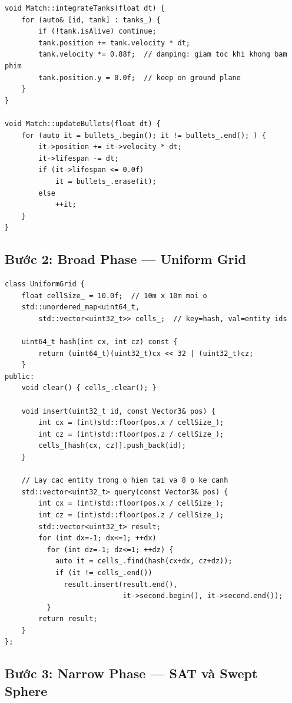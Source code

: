 \documentclass[12pt,a4paper]{report}
\begin{document}
\begin{lstlisting}[style=cppStyle, caption={Tích phân vị trí mỗi tick}, label={lst:integration}]
void Match::integrateTanks(float dt) {
    for (auto& [id, tank] : tanks_) {
        if (!tank.isAlive) continue;
        tank.position += tank.velocity * dt;
        tank.velocity *= 0.88f;  // damping: giam toc khi khong bam phim
        tank.position.y = 0.0f;  // keep on ground plane
    }
}

void Match::updateBullets(float dt) {
    for (auto it = bullets_.begin(); it != bullets_.end(); ) {
        it->position += it->velocity * dt;
        it->lifespan -= dt;
        if (it->lifespan <= 0.0f)
            it = bullets_.erase(it);
        else
            ++it;
    }
}
\end{lstlisting}

\subsection{Bước 2: Broad Phase --- Uniform Grid}

\begin{lstlisting}[style=cppStyle, caption={Uniform Grid Spatial Hash cho broad phase}, label={lst:broadphase}]
class UniformGrid {
    float cellSize_ = 10.0f;  // 10m x 10m moi o
    std::unordered_map<uint64_t,
        std::vector<uint32_t>> cells_;  // key=hash, val=entity ids

    uint64_t hash(int cx, int cz) const {
        return (uint64_t)(uint32_t)cx << 32 | (uint32_t)cz;
    }
public:
    void clear() { cells_.clear(); }

    void insert(uint32_t id, const Vector3& pos) {
        int cx = (int)std::floor(pos.x / cellSize_);
        int cz = (int)std::floor(pos.z / cellSize_);
        cells_[hash(cx, cz)].push_back(id);
    }

    // Lay cac entity trong o hien tai va 8 o ke canh
    std::vector<uint32_t> query(const Vector3& pos) {
        int cx = (int)std::floor(pos.x / cellSize_);
        int cz = (int)std::floor(pos.z / cellSize_);
        std::vector<uint32_t> result;
        for (int dx=-1; dx<=1; ++dx)
          for (int dz=-1; dz<=1; ++dz) {
            auto it = cells_.find(hash(cx+dx, cz+dz));
            if (it != cells_.end())
              result.insert(result.end(),
                            it->second.begin(), it->second.end());
          }
        return result;
    }
};
\end{lstlisting}

\subsection{Bước 3: Narrow Phase --- SAT và Swept Sphere}
\end{document}
